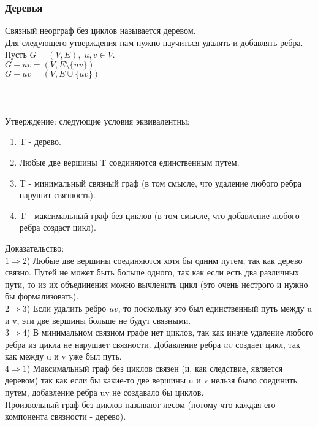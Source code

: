 \subsubsection{Деревья}
Связный неорграф без циклов называется деревом.\\
Для следующего утверждения нам нужно научиться удалять и добавлять ребра.\\
Пусть $G = (V, E), \; u, v \in V$. \\
$G - uv = (V, E \setminus \{uv\})$\\
$G + uv = (V, E \cup \{uv\})$\\\\\\\\
Утверждение: следующие условия эквивалентны:\\
\begin{enumerate}
\item T - дерево.\\
\item Любые две вершины T соединяются единственным путем.\\
\item T - минимальный связный граф (в том смысле, что удаление любого ребра нарушит связность).\\
\item T - максимальный граф без циклов (в том смысле, что добавление любого ребра создаст цикл).\\
\end{enumerate}
Доказательство:\\
$1 \Rightarrow 2$) Любые две вершины соединяются хотя бы одним путем, так как дерево связно. Путей не может быть больше одного, так как если есть два различных пути, то из их объединения можно вычленить цикл (это очень нестрого и нужно бы формализовать).\\
$2 \Rightarrow 3$) Если удалить ребро $uv$, то поскольку это был единственный путь между u и v, эти две вершины больше не будут связными.\\
$3 \Rightarrow 4$) В минимальном связном графе нет циклов, так как иначе удаление любого ребра из цикла не нарушает связности. Добавление ребра $uv$ создает цикл, так как между u и v уже был путь.\\
$4 \Rightarrow 1$) Максимальный граф без циклов связен (и, как следствие, является деревом) так как если бы какие-то две вершины u и v нельзя было соединить путем, добавление ребра uv не создавало бы циклов.\\
Произвольный граф без циклов называют лесом (потому что каждая его компонента связности - дерево).\\
